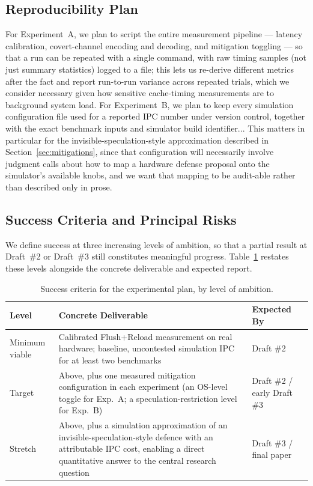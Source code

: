 \documentclass[11pt,a4paper]{article}
\begin{document}
\subsection{Reproducibility Plan}

For Experiment~A, we plan to script the entire measurement pipeline ---
latency calibration, covert-channel encoding and decoding, and mitigation
toggling --- so that a run can be repeated with a single command, with raw
timing samples (not just summary statistics) logged to a file; this lets us
re-derive different metrics after the fact and report run-to-run variance
across repeated trials, which we consider necessary given how sensitive
cache-timing measurements are to background system load. For Experiment~B, we plan to keep every simulation configuration file used for a reported IPC
number under version control, together with the exact benchmark inputs and
simulator build identifier... This
matters in particular for the invisible-speculation-style approximation
described in Section~\ref{sec:mitigations}, since that configuration will
necessarily involve judgment calls about how to map a hardware defense
proposal onto the simulator's available knobs, and we want that mapping to be
audit-able rather than described only in prose.

\subsection{Success Criteria and Principal Risks}

We define success at three increasing levels of ambition, so that a partial
result at Draft~\#2 or Draft~\#3 still constitutes meaningful progress.
Table~\ref{tab:success} restates these levels alongside the concrete
deliverable and expected report.

\begin{table}[h]
\centering
\begin{tabular}{@{}p{2cm}p{7.8cm}p{3cm}@{}}
\toprule
\textbf{Level} & \textbf{Concrete Deliverable} & \textbf{Expected By} \\
\midrule
Minimum viable & Calibrated Flush+Reload measurement on real hardware; baseline, uncontested simulation IPC for at least two benchmarks & Draft \#2 \\
\addlinespace
Target & Above, plus one measured mitigation configuration in each experiment (an OS-level toggle for Exp.\ A; a speculation-restriction level for Exp.\ B) & Draft \#2 / early Draft \#3 \\
\addlinespace
Stretch & Above, plus a simulation approximation of an invisible-speculation-style defence with an attributable IPC cost, enabling a direct quantitative answer to the central research question & Draft \#3 / final paper \\
\bottomrule
\end{tabular}
\caption{Success criteria for the experimental plan, by level of ambition.}
\label{tab:success}
\end{table}
\end{document}
